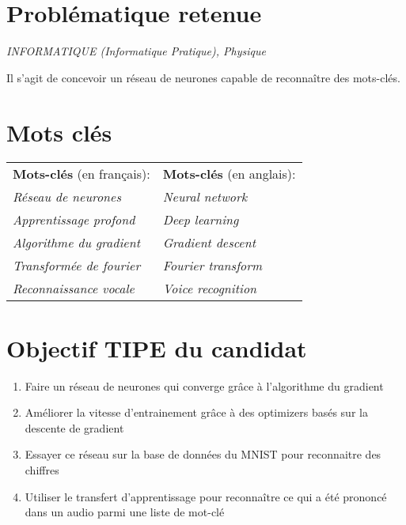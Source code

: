 \documentclass[12pt,a4paper, french]{article}
\begin{document}
\section*{Problématique retenue}
\noindent\textit{INFORMATIQUE (Informatique Pratique), Physique}

Il s’agit de concevoir un réseau de neurones capable de reconnaître des mots-clés.

\section*{Mots clés}
\begin{tabular}{l l}
    \textbf{Mots-clés} (en français): & \textbf{Mots-clés} (en anglais): \\
    \textit{Réseau de neurones} & \textit{Neural network} \\
    \textit{Apprentissage profond} & \textit{Deep learning} \\
    \textit{Algorithme du gradient} & \textit{Gradient descent} \\
    \textit{Transformée de fourier} & \textit{Fourier transform} \\
    \textit{Reconnaissance vocale} & \textit{Voice recognition} \\
\end{tabular}


\section*{Objectif TIPE du candidat}
\begin{enumerate}
    \item Faire un réseau de neurones qui converge grâce à l’algorithme du gradient
    \item Améliorer la vitesse d'entrainement grâce à des optimizers basés sur la descente de gradient
    \item Essayer ce réseau sur la base de données du MNIST pour reconnaitre des chiffres
    \item Utiliser le transfert d'apprentissage pour reconnaître ce qui a été prononcé dans un audio parmi une liste de mot-clé
\end{enumerate}
\end{document}
